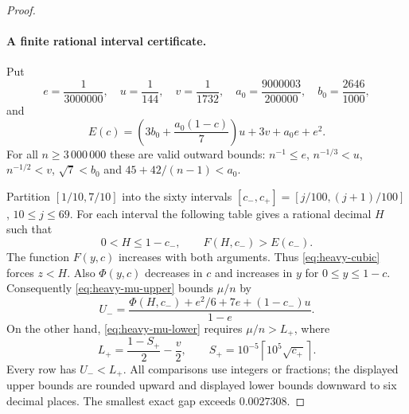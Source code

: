 \documentclass[11pt,a4paper]{article}
\theoremstyle{remark}
\numberwithin{equation}{section}
\begin{document}
\begin{proof}
\paragraph{A finite rational interval certificate.}
Put
\[
 e=\frac1{3000000},\quad u=\frac1{144},\quad v=\frac1{1732},
 \quad a_0=\frac{9000003}{200000},\quad b_0=\frac{2646}{1000},
\]
and
\[
 E(c)=\left(3b_0+\frac{a_0(1-c)}7\right)u+3v+a_0e+e^2.
\]
For all $n\ge3\,000\,000$ these are valid outward bounds:
$n^{-1}\le e$, $n^{-1/3}<u$, $n^{-1/2}<v$,
$\sqrt7<b_0$ and $45+42/(n-1)<a_0$.

Partition $[1/10,7/10]$ into the sixty intervals
$[c_-,c_+]=[j/100,(j+1)/100]$, $10\le j\le69$.
For each interval the following table gives a rational decimal $H$ such
that
\[
 0<H\le1-c_-,\qquad F(H,c_-)>E(c_-).
\]
The function $F(y,c)$ increases with both arguments. Thus
\eqref{eq:heavy-cubic} forces $z<H$. Also $\Phi(y,c)$ decreases in $c$
and increases in $y$ for $0\le y\le1-c$. Consequently
\eqref{eq:heavy-mu-upper} bounds $\mu/n$ by
\[
 U_-=\frac{\Phi(H,c_-)+e^2/6+7e+(1-c_-)u}{1-e}.
\]
On the other hand, \eqref{eq:heavy-mu-lower} requires $\mu/n>L_+$, where
\[
 L_+=\frac{1-S_+}{2}-\frac v2,
 \qquad
 S_+=10^{-5}\left\lceil10^5\sqrt{c_+}\right\rceil.
\]
Every row has $U_-<L_+$.
All comparisons use integers or fractions; the displayed upper bounds
are rounded upward and displayed lower bounds downward to six decimal
places. The smallest exact gap exceeds $0.0027308$.


\end{proof}
\end{document}
